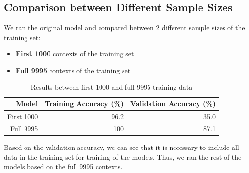 \documentclass{article}
\begin{document}
 

 

\subsection{Comparison between Different Sample Sizes}

 

 

We ran the original model and compared between 2 different sample sizes of the training set:

 

\begin{itemize}

\item  \textbf{First 1000} contexts of the training set

\item \textbf{Full 9995} contexts of the training set

\end{itemize}


\begin{table}[H] 

\begin{center}

\begin{tabular}{|r|r|r|}

 

\hline

\textbf{Model}&\textbf{Training Accuracy (\%)}&\textbf{Validation Accuracy (\%)}\\

\hline

First 1000 & 96.2 & 35.0\\

\hline

Full 9995 & 100 & 87.1\\

\hline

 

\end{tabular}
\label{tab:diffsamples}
\end{center}

\caption{Results between first 1000 and full 9995 training data}
\end{table} 

 

Based on the validation accuracy, we can see that it is necessary to include all data in the training set for training of the models. Thus, we ran the rest of the models based on the full 9995 contexts.
\end{document}
